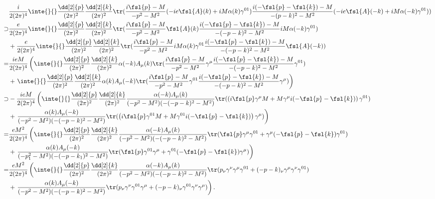 \begin{align*}
	       &\frac{i}{2(2\pi)^{4}}\inte{}{}\frac{\dd[2]{p}}{(2\pi)^{2}}\frac{\dd[2]{k}}{(2\pi)^{2}}\tr(\frac{i\fsl{p} - M}{-p^{2} - M^{2}}(-ie\fsl{A}(k) + iM\alpha(k)\gamma^{01})\frac{i(-\fsl{p} - \fsl{k}) - M}{-(p - k)^{2} - M^{2}}(-ie\fsl{A}(-k) + iM\alpha(-k)\gamma^{01})) \\
	\supset& \frac{e}{2(2\pi)^{4}}\inte{}{}\frac{\dd[2]{p}}{(2\pi)^{2}}\frac{\dd[2]{k}}{(2\pi)^{2}}\tr(\frac{i\fsl{p} - M}{-p^{2} - M^{2}}\fsl{A}(k)\frac{i(-\fsl{p} - \fsl{k}) - M}{-(-p - k)^{2} - M^{2}}iM\alpha(-k)\gamma^{01}) \\
	       &+ \frac{e}{2(2\pi)^{4}}\inte{}{}\frac{\dd[2]{p}}{(2\pi)^{2}}\frac{\dd[2]{k}}{(2\pi)^{2}}\tr(\frac{i\fsl{p} - M}{-p^{2} - M^{2}}iM\alpha(k)\gamma^{01}\frac{i(-\fsl{p} - \fsl{k}) - M}{-(-p - k)^{2} - M^{2}}\fsl{A}(-k)) \\
	      =& \frac{ieM}{2(2\pi)^{4}}\left(\inte{}{}\frac{\dd[2]{p}}{(2\pi)^{2}}\frac{\dd[2]{k}}{(2\pi)^{2}}\alpha(-k)A_{\mu}(k)\tr(\frac{i\fsl{p} - M}{-p^{2} - M^{2}}\gamma^{\mu}\frac{i(-\fsl{p} - \fsl{k}) - M}{-(-p - k)^{2} - M^{2}}\gamma^{01}) \right. \\
	       &+ \left. \inte{}{}\frac{\dd[2]{p}}{(2\pi)^{2}}\frac{\dd[2]{k}}{(2\pi)^{2}}\alpha(k)A_{\mu}(-k)\tr(\frac{i\fsl{p} - M}{-p^{2} - M^{2}}\gamma^{01}\frac{i(-\fsl{p} - \fsl{k}) - M}{-(-p - k)^{2} - M^{2}}\gamma^{\mu})\right) \\
	\supset& -\frac{ieM}{2(2\pi)^{4}}\left(\inte{}{}\frac{\dd[2]{p}}{(2\pi)^{2}}\frac{\dd[2]{k}}{(2\pi)^{2}}\frac{\alpha(-k)A_{\mu}(k)}{(-p^{2} - M^{2})(-(-p - k)^{2} - M^{2})}\tr(\left(i\fsl{p}\gamma^{\mu}M + M\gamma^{\mu}i(-\fsl{p} - \fsl{k})\right)\gamma^{01}) \right. \\
	       &+ \left. \frac{\alpha(k)A_{\mu}(-k)}{(-p^{2} - M^{2})(-(-p - k)^{2} - M^{2})}\tr(\left(i\fsl{p}\gamma^{01}M + M\gamma^{01}i(-\fsl{p} - \fsl{k})\right)\gamma^{\mu})\right) \\
	      =& \frac{eM^{2}}{2(2\pi)^{4}}\left(\inte{}{}\frac{\dd[2]{p}}{(2\pi)^{2}}\frac{\dd[2]{k}}{(2\pi)^{2}}\frac{\alpha(-k)A_{\mu}(k)}{(-p^{2} - M^{2})(-(-p - k)^{2} - M^{2})}\tr(\fsl{p}\gamma^{\mu}\gamma^{01} + \gamma^{\mu}(-\fsl{p} - \fsl{k})\gamma^{01}) \right. \\
	       &+ \left. \frac{\alpha(k)A_{\mu}(-k)}{(-p_{1}^{2} - M^{2})(-(-p - k_{1})^{2} - M^{2})}\tr(\fsl{p}\gamma^{01}\gamma^{\mu} + \gamma^{01}(-\fsl{p} - \fsl{k})\gamma^{\mu})\right) \\
	      =& \frac{eM^{2}}{2(2\pi)^{4}}\left(\inte{}{}\frac{\dd[2]{p}}{(2\pi)^{2}}\frac{\dd[2]{k}}{(2\pi)^{2}}\frac{\alpha(-k)A_{\mu}(k)}{(-p^{2} - M^{2})(-(-p - k)^{2} - M^{2})}\tr(p_{\nu}\gamma^{\nu}\gamma^{\mu}\gamma^{01} + (-p - k)_{\nu}\gamma^{\mu}\gamma^{\nu}\gamma^{01}) \right. \\
	       &+ \left. \frac{\alpha(k)A_{\mu}(-k)}{(-p^{2} - M^{2})(-(-p - k)^{2} - M^{2})}\tr(p_{\nu}\gamma^{\nu}\gamma^{01}\gamma^{\mu} + (-p - k)_{\nu}\gamma^{01}\gamma^{\nu}\gamma^{\mu})\right).
\end{align*}
